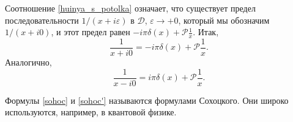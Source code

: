 Соотношение \eqref{huinya_s_potolka} означает, что существует предел последовательности $1/(x + i \varepsilon)$ в $\mathcal{D}$, $\varepsilon \to +0$, который мы обозначим $1/(x + i0)$, и этот предел равен $-i \pi \delta(x) + \mathcal{P}{\frac{1}{x}}$. Итак,
\begin{equation}
	\label{sohoc}
	\frac{1}{x + i 0} = - i \pi \delta(x) + \mathcal{P}{\frac{1}{x}}.
\end{equation}
Аналогично, 
\begin{equation}
	\label{sohoc'}
	\frac{1}{x - i0} = i \pi \delta(x) + \mathcal{P}{\frac{1}{x}}. 
\end{equation}

Формулы \eqref{sohoc} и \eqref{sohoc'} называются формулами Сохоцкого. Они широко используются, например, в квантовой физике.



